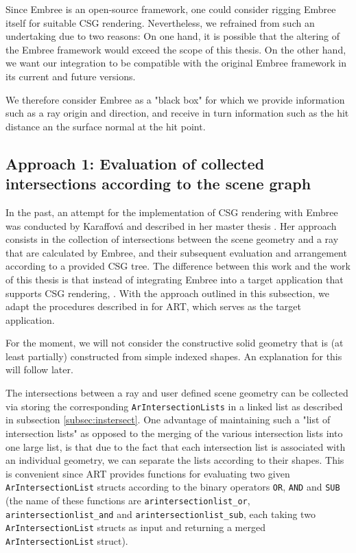 Since Embree is an open-source framework, one could consider rigging Embree itself for suitable CSG rendering. Nevertheless, we refrained from such an undertaking due to two reasons: On one hand, it is possible that the altering of the Embree framework would exceed the scope of this thesis. On the other hand, we want our integration to be compatible with the original Embree framework in its current and future versions. 

We therefore consider Embree as a "black box" for which we provide information such as a ray origin and direction, and receive in turn information such as the hit distance an the surface normal at the hit point.


\subsection{Approach 1: Evaluation of collected intersections according to the scene graph}

In the past, an attempt for the implementation of CSG rendering with Embree was conducted by Karaffová and described in her master thesis \cite{karaffova2016}. Her approach consists in the collection of intersections between the scene geometry and a ray that are calculated by Embree, and their subsequent evaluation and arrangement according to a provided CSG tree. The difference between this work and the work of this thesis is that instead of integrating Embree into a target application that supports CSG rendering,  .
With the approach outlined in this subsection, we adapt the procedures described in \cite{karaffova2016} for ART, which serves as the target application. 

For the moment, we will not consider the constructive solid geometry that is (at least partially) constructed from simple indexed shapes. An explanation for this will follow later.

The intersections between a ray and user defined scene geometry can be collected via storing the corresponding \texttt{ArIntersectionLists} in a linked list as described in subsection \ref{subsec:instersect}. One advantage of maintaining such a "list of intersection lists" as opposed to the merging of the various intersection lists into one large list, is that due to the fact that each intersection list is associated with an individual geometry, we can separate the lists according to their shapes. This is convenient since ART provides functions for evaluating two given \texttt{ArIntersectionList} structs according to the binary operators \texttt{OR}, \texttt{AND} and \texttt{SUB} (the name of these functions are \texttt{arintersectionlist\_or}, \texttt{arintersectionlist\_and} and \texttt{arintersectionlist\_sub}, each taking two \texttt{ArIntersectionList} structs as input and returning a merged \texttt{ArIntersectionList} struct).

